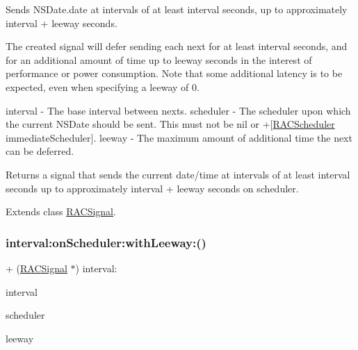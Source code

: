 Sends N\+S\+Date.\+date at intervals of at least {\ttfamily interval} seconds, up to approximately {\ttfamily interval} + {\ttfamily leeway} seconds.

The created signal will defer sending each {\ttfamily next} for at least {\ttfamily interval} seconds, and for an additional amount of time up to {\ttfamily leeway} seconds in the interest of performance or power consumption. Note that some additional latency is to be expected, even when specifying a {\ttfamily leeway} of 0.

interval -\/ The base interval between {\ttfamily next}s. scheduler -\/ The scheduler upon which the current N\+S\+Date should be sent. This must not be nil or +\mbox{[}\mbox{\hyperlink{interface_r_a_c_scheduler}{R\+A\+C\+Scheduler}} immediate\+Scheduler\mbox{]}. leeway -\/ The maximum amount of additional time the {\ttfamily next} can be deferred.

Returns a signal that sends the current date/time at intervals of at least {\ttfamily interval seconds} up to approximately {\ttfamily interval} + {\ttfamily leeway} seconds on {\ttfamily scheduler}. 

Extends class \mbox{\hyperlink{interface_r_a_c_signal_acd968c129ec1afe3b5bc77db5fc13291}{R\+A\+C\+Signal}}.

\mbox{\label{category_r_a_c_signal_07_operations_08_acd968c129ec1afe3b5bc77db5fc13291}} 
\subsubsection{\texorpdfstring{interval\+:on\+Scheduler\+:with\+Leeway\+:()}{interval:onScheduler:withLeeway:()}\hspace{0.1cm}{\footnotesize\ttfamily [2/3]}}
{\footnotesize\ttfamily + (\mbox{\hyperlink{interface_r_a_c_signal}{R\+A\+C\+Signal}} $\ast$) interval\+: \begin{DoxyParamCaption}\item[{(N\+S\+Time\+Interval)}]{interval }\item[{onScheduler:(\mbox{\hyperlink{interface_r_a_c_scheduler}{R\+A\+C\+Scheduler}} $\ast$)}]{scheduler }\item[{withLeeway:(N\+S\+Time\+Interval)}]{leeway }\end{DoxyParamCaption}}

